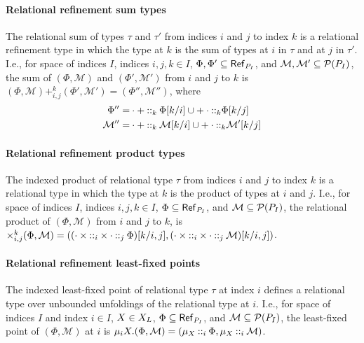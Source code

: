 \paragraph{Relational refinement sum types} The relational sum of
types $\tau$ and $\tau'$ from indices $i$ and $j$ to index $k$ is a
relational refinement type in which the type at $k$ is the sum of
types at $i$ in $\tau$ and at $j$ in $\tau'$.
%
I.e., for space of indices $I$, indices $i, j, k \in I$,
$\Phi, \Phi' \subseteq \mathsf{Ref}_{ P_{I} }$, and
$\mathcal{M}, \mathcal{M}' \subseteq \mathcal{P}(P_{I})$, the sum of
$(\Phi, \mathcal{M})$ and $(\Phi', \mathcal{M}')$ from $i$ and $j$ to
$k$ is $(\Phi, \mathcal{M}) +_{i, j}^k (\Phi', \mathcal{M}') = (\Phi'', \mathcal{M}'')$, where
%
\begin{align*}
  \Phi'' = & \tyleftsum \prepend{k} \rename{ \Phi }{ i }{ k } \union %
             \tyrightsum \prepend{k} \rename{ \Phi }{ j }{ k } \\
  \mathcal{M}'' = & \tyleftsum \prepend{k} \rename{ \mathcal{M} }{ i }{ k } \union
                    \tyrightsum \prepend{k} \rename{ \mathcal{M}' }{ j }{ k }
\end{align*}

\paragraph{Relational refinement product types}
The indexed product of relational type $\tau$ from indices $i$ and $j$
to index $k$ is a relational type in which the type at $k$ is the
product of types at $i$ and $j$.
%
I.e., for space of indices $I$, indices $i, j, k \in I$,
$\Phi \subseteq \mathsf{Ref}_{ P_{I} }$, and
$\mathcal{M} \subseteq \mathcal{P}(P_{I})$, the relational product of
$(\Phi, \mathcal{M})$ from $i$ and $j$ to $k$, is
$\times_{i, j}^k (\Phi, \mathcal{M}) = %
(\rename{ (\tyleftprod \prepend{i} \tyrightprod \prepend{j} \Phi) }{i,
  j}{ k }, %
\rename{ (\tyleftprod \prepend{i} \tyrightprod \prepend{j}
  \mathcal{M}) }{i, j}{ k })$.
%

\paragraph{Relational refinement least-fixed points}
The indexed least-fixed point of relational type $\tau$ at index $i$
defines a relational type over unbounded unfoldings of the relational
type at $i$.
%
I.e., for space of indices $I$ and index $i \in I$, $X \in X_L$,
$\Phi \subseteq \mathsf{Ref}_{ P_{I} }$, and
$\mathcal{M} \subseteq \mathcal{P}(P_{I})$, the least-fixed point of
$(\Phi, \mathcal{M})$ at $i$ is $\mu_i X. (\Phi, \mathcal{M}) = %
(\mu_X \prepend{i} \Phi, \mu_X \prepend{i} \mathcal{M})$.

